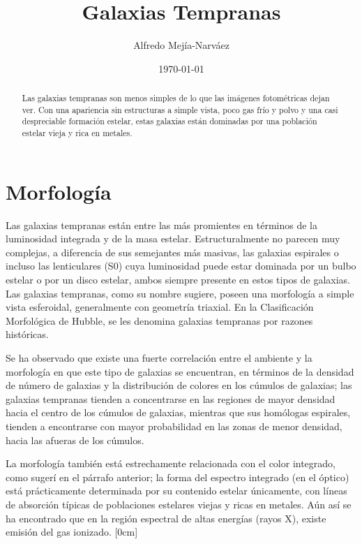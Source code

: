 \documentclass[a4paper,twoside]{article}
\title{Galaxias Tempranas}
\author{Alfredo Mejía-Narváez}
\date{\today}
\begin{document}
\maketitle

\begin{abstract}
Las galaxias tempranas son menos simples de lo que las imágenes fotométricas dejan ver. Con una apariencia sin estructuras a simple vista, poco gas frío y polvo y una casi despreciable formación estelar, estas galaxias están dominadas por una población estelar vieja y rica en metales. 
\end{abstract}

\section{Morfología}

Las galaxias tempranas están entre las más promientes en términos de la luminosidad integrada y de la masa estelar. Estructuralmente no parecen muy complejas, a diferencia de sus semejantes más masivas, las galaxias espirales o incluso las lenticulares (S0) cuya luminosidad puede estar dominada por un bulbo estelar o por un disco estelar, ambos siempre presente en estos tipos de galaxias. Las galaxias tempranas, como su nombre sugiere, poseen una morfología a simple vista esferoidal, generalmente con geometría triaxial. En la Clasificación Morfológica de Hubble, se les denomina galaxias tempranas por razones históricas.

Se ha observado que existe una fuerte correlación entre el ambiente y la morfología en que este tipo de galaxias se encuentran, en términos de la densidad de número de galaxias y la distribución de colores en los cúmulos de galaxias; las galaxias tempranas tienden a concentrarse en las regiones de mayor densidad hacia el centro de los cúmulos de galaxias, mientras que sus homólogas espirales, tienden a encontrarse con mayor probabilidad en las zonas de menor densidad, hacia las afueras de los cúmulos.

La morfología también está estrechamente relacionada con el color integrado, como sugerí en el párrafo anterior; la forma del espectro integrado (en el óptico) está prácticamente determinada por su contenido estelar únicamente, con líneas de absorción típicas de poblaciones estelares viejas y ricas en metales. Aún así se ha encontrado que en la región espectral de altas energías (rayos X), existe emisión del gas ionizado. [0cm]
\end{document}
